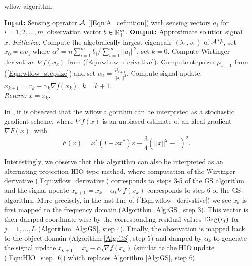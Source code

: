 \begin{algorithm}[H]
\caption{wflow algorithm}	\label{Alg:wflow}

\begin{algorithmic}[1]
	\Statex 	\textbf{Input:} Sensing operator ${\mathcal A}$ (\ref{Eqn:A_definition}) with sensing vectors $a_i$ for $i =1, 2, \ldots, m$, observation vector $b \in {\mathbb R}^m_+$.
	\Statex 	\textbf{Output:} Approximate solution signal $x$.
	\State 		\textit{Initialize:} Compute the algebraically largest eigenpair $(\lambda_1, v_1)$ of ${\mathcal A}^*b$, set $x_0 = \alpha v_1$ where $\alpha^2 =  n \sum_{i=1}^mb_i / \sum_{i=1}^m ||a_i||^2$, set $k = 0$.
		\State	Compute Wirtinger derivative: $\nabla f(x_k)$ from (\ref{Eqn:wflow_derivative}).
		\State	Compute stepsize: $\mu_{k+1}$ from (\ref{Eqn:wflow_stepsize}) and set $\alpha_k = \frac{\mu_{k+1}}{||x_0||^2}$.
		\State 	Compute signal update: $x_{k+1} = x_k - \alpha_k \nabla f(x_k)$.
		\State	$k = k + 1$.
	\EndWhile	\\
	\textit{Return:} $x =  x_k$.
\end{algorithmic}
\end{algorithm}


In \cite[Section 2.3]{DBLP:journals/tit/CandesLS15}, it is observed that the wflow algorithm can be interpreted as a stochastic gradient scheme, where $\nabla f(x)$ is an unbiased estimate of an ideal gradient $\nabla F(x)$, with
\begin{equation}
F(x) = x^* \left( I - \bar{x}\bar{x}^* \right) x - \frac{3}{4} \left( ||x||^2 - 1\right)^2.
\end{equation}

Interestingly, we observe that this algorithm can also be interpreted as an alternating projection HIO-type method, where computation of the Wirtinger derivative (\ref{Eqn:wflow_derivative}) corresponds to steps 3-5 of the GS algorithm and the signal update $x_{k+1} = x_k - \alpha_k \nabla f(x_k)$ corresponds to step 6 of the GS algorithm.  More precisely, in the last line of (\ref{Eqn:wflow_derivative}) we see $x_k$ is first mapped to the frequency domain (Algorithm \ref{Alg:GS}, step 3).  This vector is then damped coordinate-wise by the corresponding residual values $\textnormal{Diag}(r_j)$ for $j = 1, \ldots, L$  (Algorithm \ref{Alg:GS}, step 4).  Finally, the observation is mapped back to the object domain (Algorithm \ref{Alg:GS}, step 5) and damped by $\alpha_k$ to generate the signal update $x_{k+1} = x_k - \alpha_k \nabla f(x_k)$ (similar to the HIO update (\ref{Eqn:HIO_step_6}) which replaces Algorithm \ref{Alg:GS}, step 6).  

